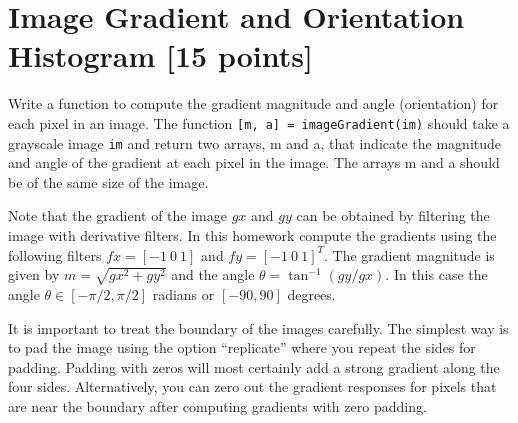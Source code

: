 \documentclass[10pt,letterpaper]{article}
\newcommand{\cmd}[1] {{\color{blue}\texttt{#1}}}
\begin{document}
\newpage
\section{Image Gradient and Orientation Histogram [15 points]}
Write a function to compute the gradient magnitude and angle (orientation) for
each pixel in an image. 
The function \cmd{[m, a] = imageGradient(im)}
should take a grayscale image \cmd{im} and return two arrays, m and a,
that indicate the magnitude and angle of the gradient at each pixel in
the image. The arrays m and a should be of the same size of the image.

Note that the gradient of the image $gx$ and $gy$ can be obtained by
filtering the image with derivative filters. In this homework compute
the gradients using the following filters
$fx = [-1~0~1]$ and $fy = [-1~ 0 ~1]^T$.
The gradient magnitude is given by $m = \sqrt{gx^2 + gy^2}$ and the angle
$\theta = \tan^{-1}(gy/gx)$. In this case the angle $\theta \in
[-\pi/2,\pi/2]$ radians or $[-90, 90]$ degrees.

It is important to treat the boundary of the images carefully.
The simplest way is to pad the image using the option ``replicate''
where you repeat the sides for padding.
Padding with zeros will most certainly add a strong gradient
along the four sides.
Alternatively, you can zero out the gradient responses for pixels that
are near the boundary after computing gradients with
zero padding.
\end{document}

